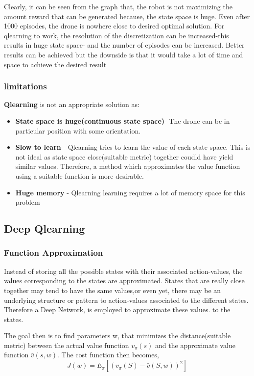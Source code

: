 \documentclass[12pt]{article}
\begin{document}
Clearly, it can be seen from the graph that, the robot is not maximizing the amount reward that can be generated because, the state space is
huge. Even after 1000 episodes, the drone is nowhere close to desired optimal solution.  For qlearning to work, the resolution of the 
discretization can be increased-this results in huge state space- and the number of episodes can be increased. Better results can be achieved
but the downside is that it would take a lot of time and space to achieve the desired result

\subsubsection{limitations}
\textbf{Qlearning} is not an appropriate solution as:
\begin{itemize}
  \item \textbf{State space is huge(continuous state space)}- The drone can be in particular position with some orientation. 
  \item \textbf{Slow to learn} - Qlearning tries to learn the value of each state space. This is not ideal as state space
        close(suitable metric) together coudld have yield similar values. Therefore, a method which approximates the value function
        using a suitable function is more desirable.
  \item \textbf{Huge memory} - Qlearning learning requires a lot of memory space for this problem
\end{itemize}

\subsection{Deep Qlearning}
\subsubsection{Function Approximation}
Instead of storing all the possible states with their associated action-values, the values corresponding to the states are approximated. 
States that are really close together may tend to have the same values,or even yet, there may be an underlying structure or pattern to 
action-values associated to the different states. Therefore a Deep Network, is employed to approximate these values. 
to the states.

The goal then is to find parameters w, that minimizes the distance(suitable metric) between the actual value function $v_\pi(s)$ and 
the approximate value function $\bar{v}(s,w)$.
The cost function then becomes,
\begin{equation}
    J(w) =  E_\pi[(v_\pi(S) - \bar{v}(S,w))^2]
\end{equation}
\end{document}
